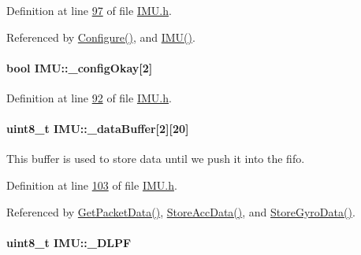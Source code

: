 Definition at line \hyperlink{_i_m_u_8h_source_l00097}{97} of file \hyperlink{_i_m_u_8h_source}{IMU.h}.



Referenced by \hyperlink{_i_m_u_8cpp_source_l00803}{Configure()}, and \hyperlink{_i_m_u_8cpp_source_l00020}{IMU()}.

\hypertarget{class_i_m_u_a53aa928d2d68a5287da893bd157e7cbe}{
\paragraph[{\_\-configOkay}]{\setlength{\rightskip}{0pt plus 5cm}bool {\bf IMU::\_\-configOkay}\mbox{[}2\mbox{]}}\hfill}
\label{class_i_m_u_a53aa928d2d68a5287da893bd157e7cbe}


Definition at line \hyperlink{_i_m_u_8h_source_l00092}{92} of file \hyperlink{_i_m_u_8h_source}{IMU.h}.

\hypertarget{class_i_m_u_ab87a54288295d4d10d605cf6c21d4d0f}{
\paragraph[{\_\-dataBuffer}]{\setlength{\rightskip}{0pt plus 5cm}uint8\_\-t {\bf IMU::\_\-dataBuffer}\mbox{[}2\mbox{]}\mbox{[}20\mbox{]}}\hfill}
\label{class_i_m_u_ab87a54288295d4d10d605cf6c21d4d0f}


This buffer is used to store data until we push it into the fifo. 



Definition at line \hyperlink{_i_m_u_8h_source_l00103}{103} of file \hyperlink{_i_m_u_8h_source}{IMU.h}.



Referenced by \hyperlink{_i_m_u_8cpp_source_l00603}{GetPacketData()}, \hyperlink{_i_m_u_8cpp_source_l00588}{StoreAccData()}, and \hyperlink{_i_m_u_8cpp_source_l00581}{StoreGyroData()}.

\hypertarget{class_i_m_u_a3f9e6159234449cde8f5e72da8acf751}{
\paragraph[{\_\-DLPF}]{\setlength{\rightskip}{0pt plus 5cm}uint8\_\-t {\bf IMU::\_\-DLPF}}\hfill}
\label{class_i_m_u_a3f9e6159234449cde8f5e72da8acf751}


